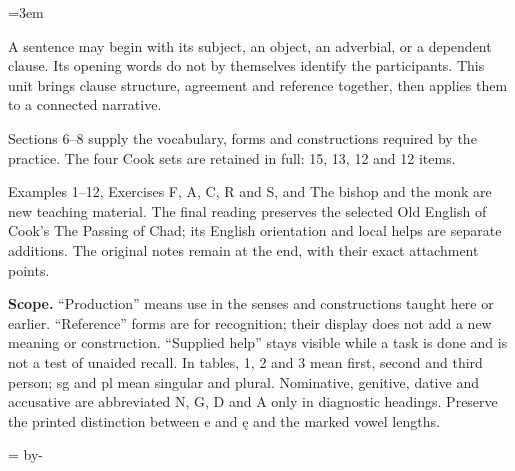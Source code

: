 \newcommand{\runningtitle}{Unit 13. Clause order and reference}

\emergencystretch=3em
\newcommand{\itempara}[2]{\par\addvspace{3pt}\noindent\hangindent=1.8em\hangafter=1\makebox[1.8em][l]{#1.}#2\par}
\newcommand{\reserve}[1]{\par\penalty-100\begingroup\dimen0=\pagegoal\advance\dimen0 by-\pagetotal\ifdim\dimen0<#1\newpage\fi\endgroup}

\raggedright
{}

A sentence may begin with its subject, an object, an adverbial, or a dependent clause. Its opening words do not by themselves identify the participants. This unit brings clause structure, agreement and reference together, then applies them to a connected narrative.

Sections 6–8 supply the vocabulary, forms and constructions required by the practice. The four Cook sets are retained in full: 15, 13, 12 and 12 items.

Examples 1–12, Exercises F, A, C, R and S, and The bishop and the monk are new teaching material. The final reading preserves the selected Old English of Cook’s The Passing of Chad; its English orientation and local helps are separate additions. The original notes remain at the end, with their exact attachment points.

\textbf{Scope.} “Production” means use in the senses and constructions taught here or earlier. “Reference” forms are for recognition; their display does not add a new meaning or construction. “Supplied help” stays visible while a task is done and is not a test of unaided recall. In tables, 1, 2 and 3 mean first, second and third person; sg and pl mean singular and plural. Nominative, genitive, dative and accusative are abbreviated N, G, D and A only in diagnostic headings. Preserve the printed distinction between e and ę and the marked vowel lengths.

\reserve{7\baselineskip}
